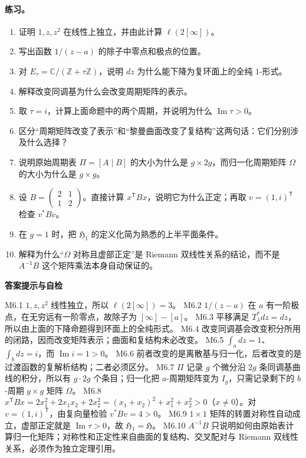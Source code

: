 \documentclass[UTF8,fontset=none,a4paper,11pt]{ctexart}
\theoremstyle{foundation-definition}
\theoremstyle{foundation-theorem}
\theoremstyle{foundation-proposition}
\theoremstyle{foundation-example}
\theoremstyle{foundation-remark}
\theoremstyle{foundation-theorem}
\newenvironment{answerkey}{%
\begin{mdframed}[backgroundcolor=examplebg,linecolor=examplepurple,linewidth=1.0pt,
  leftline=true,rightline=false,topline=false,bottomline=false,
  skipabove=7pt,skipbelow=8pt,innerleftmargin=10pt,innerrightmargin=8pt,
  innertopmargin=6pt,innerbottommargin=6pt]
{\sffamily\bfseries\color{examplepurple}答案提示与自检}\par\smallskip\small
}{\end{mdframed}}
\begin{document}
\paragraph{练习。}
\begin{enumerate}[label=M6.\arabic*.]
  \item 证明 \(1,z,z^2\) 在线性上独立，并由此计算 \(\ell(2[\infty])\)。
  \item 写出函数 \(1/(z-a)\) 的除子中零点和极点的位置。
  \item 对 \(E_\tau=\mathbb C/(\mathbb Z+\tau\mathbb Z)\)，说明 \(dz\) 为什么能下降为复环面上的全纯 \(1\)-形式。
  \item 解释改变同调基为什么会改变周期矩阵的表示。
  \item 取 \(\tau=i\)，计算上面命题中的两个周期，并说明为什么 \(\operatorname{Im}\tau>0\)。
  \item 区分“周期矩阵改变了表示”和“黎曼曲面改变了复结构”这两句话：它们分别涉及什么选择？
  \item 说明原始周期表 \(\Pi=[A\mid B]\) 的大小为什么是 \(g\times2g\)，而归一化周期矩阵 \(\Omega\) 的大小为什么是 \(g\times g\)。
  \item 设 \(B=\begin{pmatrix}2&1\\1&2\end{pmatrix}\)。直接计算 \(x^{\mathsf T}Bx\)，说明它为什么正定；再取 \(v=(1,i)^{\mathsf T}\) 检查 \(v^*Bv\)。
  \item 在 \(g=1\) 时，把 \(\mathfrak H_1\) 的定义化简为熟悉的上半平面条件。
  \item 解释为什么“\(\Omega\) 对称且虚部正定”是 Riemann 双线性关系的结论，而不是 \(A^{-1}B\) 这个矩阵乘法本身自动保证的。
\end{enumerate}

\begin{answerkey}
M6.1 \(1,z,z^2\) 线性独立，所以 \(\ell(2[\infty])=3\)。
M6.2 \(1/(z-a)\) 在 \(a\) 有一阶极点，在无穷远有一阶零点，故除子为 \([\infty]-[a]\)。
M6.3 平移满足 \(T_\lambda^*dz=dz\)，所以由上面的下降命题得到环面上的全纯形式。
M6.4 改变同调基会改变积分所用的闭路，因而改变矩阵表示；曲面和复结构未必改变。
M6.5 \(\int_a dz=1\)、\(\int_b dz=i\)，而 \(\operatorname{Im}i=1>0\)。
M6.6 前者改变的是离散基与归一化，后者改变的是过渡函数的复解析结构；二者必须区分。
M6.7 \(\Pi\) 记录 \(g\) 个微分沿 \(2g\) 条同调基曲线的积分，所以有 \(g\cdot2g\) 个条目；归一化把 \(a\)-周期矩阵变为 \(I_g\)，只需记录剩下的 \(b\)-周期 \(g\times g\) 矩阵 \(\Omega\)。
M6.8 \(x^{\mathsf T}Bx=2x_1^2+2x_1x_2+2x_2^2=(x_1+x_2)^2+x_1^2+x_2^2>0\)（\(x\neq0\)）。对 \(v=(1,i)^{\mathsf T}\)，由复向量检验 \(v^*Bv=4>0\)。
M6.9 \(1\times1\) 矩阵的转置对称性自动成立，虚部正定就是 \(\operatorname{Im}\tau>0\)，故 \(\mathfrak H_1=\mathfrak H\)。
M6.10 \(A^{-1}B\) 只说明如何由原始表计算归一化矩阵；对称性和正定性来自曲面的复结构、交叉配对与 Riemann 双线性关系，必须作为独立定理引用。
\end{answerkey}
\end{document}
